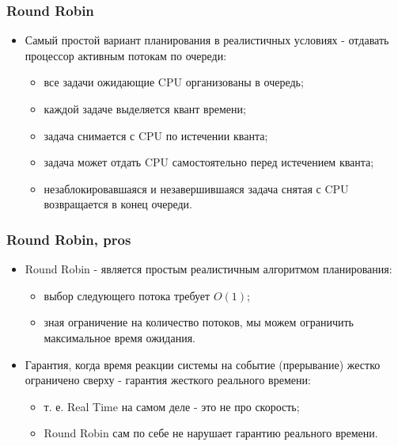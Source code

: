 \begin{frame}
\frametitle{Round Robin}
\begin{itemize}
  \item Самый простой вариант планирования в реалистичных условиях - отдавать
  процессор активным потокам по очереди:
  \begin{itemize}
    \item все задачи ожидающие CPU организованы в очередь;
    \item каждой задаче выделяется квант времени;
    \item задача снимается с CPU по истечении кванта;
    \item задача может отдать CPU самостоятельно перед истечением кванта;
    \item незаблокировавшаяся и незавершившаяся задача снятая с CPU возвращается
    в конец очереди.
  \end{itemize}
\end{itemize}
\end{frame}

\begin{frame}
\frametitle{Round Robin, pros}
\begin{itemize}
  \item Round Robin - является простым реалистичным алгоритмом планирования:
  \begin{itemize}
    \item выбор следующего потока требует $O\left(1\right)$;
    \item зная ограничение на количество потоков, мы можем ограничить
    максимальное время ожидания.
  \end{itemize}
  \item Гарантия, когда время реакции системы на событие (прерывание) жестко
  ограничено сверху - гарантия жесткого реального времени:
  \begin{itemize}
    \item т. е. Real Time на самом деле - это не про скорость;
    \item Round Robin сам по себе не нарушает гарантию реального времени.
  \end{itemize}
\end{itemize}
\end{frame}


